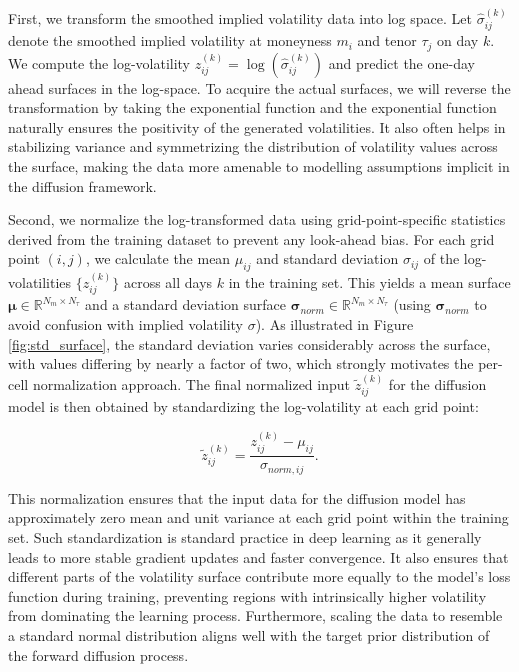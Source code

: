 \documentclass{article}
\begin{document}
First, we transform the smoothed implied volatility data into log space. Let $\hat{\sigma}_{ij}^{(k)}$ denote the smoothed implied volatility at moneyness $m_i$ and tenor $\tau_j$ on day $k$. We compute the log-volatility $z_{ij}^{(k)} = \log(\hat{\sigma}_{ij}^{(k)})$ and predict the one-day ahead surfaces in the log-space. To acquire the actual surfaces, we will reverse the transformation by taking the exponential function and the exponential function naturally ensures the positivity of the generated volatilities. It also often helps in stabilizing variance and symmetrizing the distribution of volatility values across the surface, making the data more amenable to modelling assumptions implicit in the diffusion framework.

Second, we normalize the log-transformed data using grid-point-specific statistics derived from the training dataset to prevent any look-ahead bias. For each grid point $(i, j)$, we calculate the mean $\mu_{ij}$ and standard deviation $\sigma_{ij}$ of the log-volatilities $\{z_{ij}^{(k)}\}$ across all days $k$ in the training set. This yields a mean surface $\bm{\mu} \in \mathbb{R}^{N_m \times N_\tau}$ and a standard deviation surface $\bm{\sigma}_{norm} \in \mathbb{R}^{N_m \times N_\tau}$ (using $\bm{\sigma}_{norm}$ to avoid confusion with implied volatility $\sigma$). As illustrated in Figure \ref{fig:std_surface}, the standard deviation varies considerably across the surface, with values differing by nearly a factor of two, which strongly motivates the per-cell normalization approach. The final normalized input $\tilde{z}_{ij}^{(k)}$ for the diffusion model is then obtained by standardizing the log-volatility at each grid point:

\begin{equation} \label{eq:normalization}
\tilde{z}_{ij}^{(k)} = \frac{z_{ij}^{(k)} - \mu_{ij}}{\sigma_{norm, ij}}.
\end{equation}

This normalization ensures that the input data for the diffusion model has approximately zero mean and unit variance at each grid point within the training set. Such standardization is standard practice in deep learning as it generally leads to more stable gradient updates and faster convergence. It also ensures that different parts of the volatility surface contribute more equally to the model's loss function during training, preventing regions with intrinsically higher volatility from dominating the learning process. Furthermore, scaling the data to resemble a standard normal distribution aligns well with the target prior distribution of the forward diffusion process.
\end{document}
